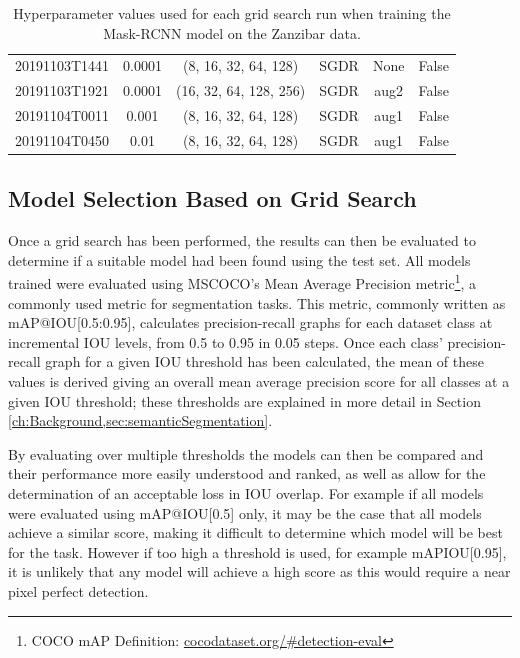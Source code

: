 \begin{table}[!ht]
\begin{adjustbox}{width=\columnwidth, center}
\begin{tabular}{cccccc}
			20191103T1441 &       0.0001 &     (8, 16, 32, 64, 128) &      SGDR &                  None &                  False \\
			20191103T1921 &       0.0001 &   (16, 32, 64, 128, 256) &      SGDR &                  aug2 &                  False \\
			20191104T0011 &        0.001 &     (8, 16, 32, 64, 128) &      SGDR &                  aug1 &                  False \\
			20191104T0450 &         0.01 &     (8, 16, 32, 64, 128) &      SGDR &                  aug1 &                  False \\
			\bottomrule
		\end{tabular}
	\end{adjustbox}
	\caption{Hyperparameter values used for each grid search run when training the Mask-RCNN model on the Zanzibar data.}\label{tab:MaskRCNNHyperparamTuningGridSearch}
\end{table}

\subsection{Model Selection Based on Grid Search}\label{ch:cetDet,sec:ModelSelection,sub:ModelSelectionBasedOnGridSearch}

Once a grid search has been performed, the results can then be evaluated to determine if a suitable model had been found using the test set. All models trained were evaluated using MSCOCO's Mean Average Precision metric\footnote{COCO mAP Definition: \href{https://cocodataset.org/\#detection-eval}{cocodataset.org/\#detection-eval}}, a commonly used metric for segmentation tasks. This metric, commonly written as mAP@IOU[0.5:0.95], calculates precision-recall graphs for each dataset class at incremental IOU levels, from 0.5 to 0.95 in 0.05 steps. Once each class' precision-recall graph for a given IOU threshold has been calculated, the mean of these values is derived giving an overall mean average precision score for all classes at a given IOU threshold; these thresholds are explained in more detail in Section \ref{ch:Background,sec:semanticSegmentation}.

By evaluating over multiple thresholds the models can then be compared and their performance more easily understood and ranked, as well as allow for the determination of an acceptable loss in IOU overlap. For example if all models were evaluated using mAP@IOU[0.5] only, it may be the case that all models achieve a similar score, making it difficult to determine which model will be best for the task. However if too high a threshold is used, for example mAPIOU[0.95], it is unlikely that any model will achieve a high score as this would require a near pixel perfect detection. 

